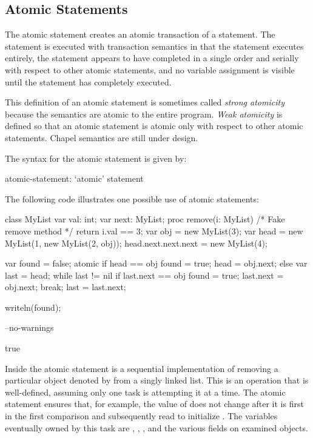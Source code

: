 \subsection{Atomic Statements}
\label{Atomic_Transactions}
\label{atomicity}

The atomic statement creates an atomic transaction of a statement. The
statement is executed with transaction semantics in that the statement
executes entirely, the statement appears to have completed in a single
order and serially with respect to other atomic statements, and no
variable assignment is visible until the statement has completely
executed.

\begin{openissue}
This definition of an atomic statement is sometimes called {\em strong
atomicity} because the semantics are atomic to the entire program.
{\em Weak atomicity} is defined so that an atomic statement is atomic
only with respect to other atomic statements.  Chapel semantics are
still under design.
\end{openissue}

The syntax for the atomic statement is given by:
\begin{syntax}
atomic-statement:
  `atomic' statement
\end{syntax}

\begin{example}
The following code illustrates one possible use of atomic statements:
\begin{chapelpre}
class MyList {
  var val: int;
  var next: MyList;
  proc remove(i: MyList) {
    /* Fake remove method */
    return i.val == 3;
  }
}
var obj = new MyList(3);
var head = new MyList(1, new MyList(2, obj));
head.next.next.next = new MyList(4);
\end{chapelpre}
\begin{chapel}
var found = false;
atomic {
  if head == obj {
    found = true;
    head = obj.next;
  } else {
    var last = head;
    while last != nil {
      if last.next == obj {
        found = true;
        last.next = obj.next;
        break;
      }
      last = last.next;
    }
  }
}
\end{chapel}
\begin{chapelpost}
writeln(found);
\end{chapelpost}
\begin{chapelcompopts}
--no-warnings
\end{chapelcompopts}
\begin{chapeloutput}
true
\end{chapeloutput}
Inside the atomic statement is a sequential implementation of removing
a particular object denoted by  from a singly linked list.
This is an operation that is well-defined, assuming only one task is
attempting it at a time. The atomic statement ensures that, for
example, the value of  does not change after it is first in
the first comparison and subsequently read to
initialize . The variables eventually owned by this task
are , , , and the various 
fields on examined objects.
\end{example}

